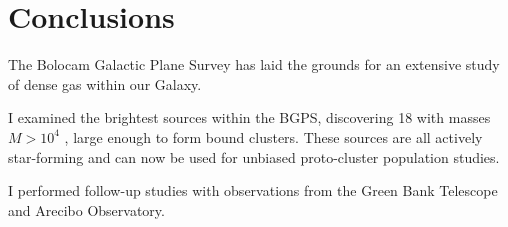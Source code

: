 
\chapter{Conclusions}
\label{ch:conclusion}
The Bolocam Galactic Plane Survey has laid the grounds for an extensive study
of dense gas within our Galaxy.

I examined the brightest sources within the BGPS, discovering 18 with masses
$M>10^4$ \msun, large enough to form bound clusters.  These sources are all
actively star-forming and can now be used for unbiased proto-cluster population
studies.

I performed follow-up studies with \formaldehyde observations from the Green
Bank Telescope and Arecibo Observatory.




